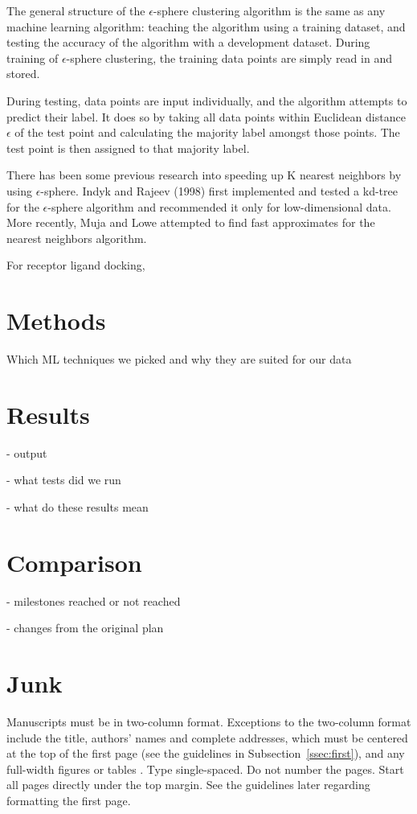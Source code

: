 \documentclass[11pt,letterpaper]{article}
\begin{document}
The general structure of the $\epsilon$-sphere clustering algorithm is the same as any machine learning algorithm: teaching the algorithm using a training dataset, and testing the accuracy of the algorithm with a development dataset. During training of $\epsilon$-sphere clustering, the training data points are simply read in and stored. 

During testing, data points are input individually, and the algorithm attempts to predict their label. It does so by taking all data points within Euclidean distance $\epsilon$ of the test point and calculating the majority label amongst those points. The test point is then assigned to that majority label.

There has been some previous research into speeding up K nearest neighbors by using $\epsilon$-sphere. Indyk and Rajeev (1998) first implemented and tested a kd-tree for the $\epsilon$-sphere algorithm and recommended it only for low-dimensional data. More recently, Muja and Lowe attempted to find fast approximates for the nearest neighbors algorithm.

For receptor ligand docking, 


\section{Methods}

Which ML techniques we picked and why they are suited for our data

\section{Results}
- output

- what tests did we run

- what do these results mean

\section{Comparison}

- milestones reached or not reached

- changes from the original plan


\section{Junk}
Manuscripts must be in two-column format.  Exceptions to the
two-column format include the title, authors' names and complete
addresses, which must be centered at the top of the first page (see
the guidelines in Subsection~\ref{ssec:first}), and any full-width
figures or tables .  Type single-spaced.  Do not number the pages.
Start all pages directly under the top margin.  See the guidelines
later regarding formatting the first page.
\end{document}
